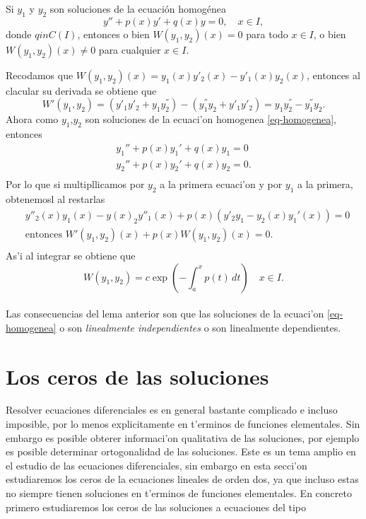 \documentclass[main.tex]{subfiles}
\begin{document}
\begin{lema}
Si \(y_1\) y \(y_2\) son soluciones de la ecuación homogénea
\begin{equation}\label{eq-homogenea}
y''+p(x)y'+q(x)y=0,\quad x\in I,
\end{equation}
donde \(q in C(I)\), entonces o bien \(W(y_1,y_2)(x)=0\) para todo \(x\in I\), o bien \(W(y_1,y_2)(x)\neq0\) para cualquier \(x\in I\).
\end{lema}
\dem Recodamos que \(W(y_{1},y_{2})(x)=y_{1}(x)y'_{2}(x)-y'_{1}(x)y_{2}(x)\), entonces al clacular su derivada se obtiene que
\[
  W'(y_{1},y_{2})=(y'_{1}y'_{2}+y_{1}y^{''}_{2})-(y^{''}_{1}y_{2}+y'_{1}y'_{2})=y_{1}y^{''}_{2}-y^{''}_{1}y_{2}.
\]
Ahora como \(y_{1}\),\(y_{2}\) son soluciones de la ecuaci'on homogenea \ref{eq-homogenea}, entonces
\begin{align*}
  y_1''+p(x)y_1'+q(x)y_1=0\\
  y_2''+p(x)y_2'+q(x)y_2=0.\\
\end{align*}
Por lo que si multipllicamos por \(y_{2}\) a la primera ecuaci'on y por \(y_{1}\) a la primera, obtenemosl al restarlas
\begin{align*}
  & y''_{2}(x)y_1(x)-y(x)_{2}y''_1(x) + p(x)(y'_{2}y_1-y_{2}(x)y_1'(x))=0\\
  &\text{entonces } W'(y_{1},y_{2})(x) + p(x)W(y_{1},y_{2})(x)= 0.\\
\end{align*}
As'i al integrar se obtiene que
\[
  W(y_{1},y_{2})=c\exp\left(-\int_{a}^{x}p(t)\,dt\right)\quad x\in I.
\]
\QED\\
\obs Las consecuencias del lema anterior son que las soluciones de la ecuaci'on \ref{eq-homogenea} o son \emph{linealmente independientes} o son linealmente dependientes.
\section{Los ceros de las soluciones}
\noindent Resolver ecuaciones diferenciales es en general bastante complicado e incluso imposible, por lo menos explicitamente en t'erminos de funciones elementales. Sin embargo es posible obterer informaci'on qualitativa de las soluciones, por ejemplo es posible determinar ortogonalidad de las soluciones. Este es un tema amplio en el estudio de las ecuaciones diferenciales, sin embargo en esta secci'on estudiaremos los ceros de la ecuaciones lineales de orden dos, ya que incluso estas no siempre tienen soluciones en t'erminos de funciones elementales. En concreto primero estudiaremos los ceros de las soluciones a ecuaciones del tipo
\end{document}
